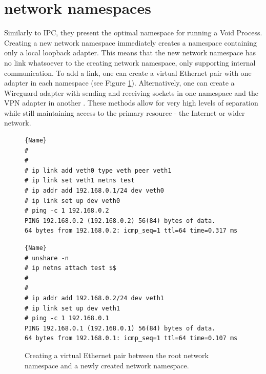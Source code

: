\documentclass[a4paper,12pt,twoside,openright]{report}
\begin{document}
\section{network namespaces}
\label{sec:voiding-net}

Similarly to IPC, they present the optimal namespace for running a Void Process. Creating a new network namespace immediately creates a namespace containing only a local loopback adapter. This means that the new network namespace has no link whatsoever to the creating network namespace, only supporting internal communication. To add a link, one can create a virtual Ethernet pair with one adapter in each namespace (see Figure \ref{fig:virtual-ethernet}). Alternatively, one can create a Wireguard adapter with sending and receiving sockets in one namespace and the VPN adapter in another \citep[§7.3]{donenfeld_wireguard_2017}. These methods allow for very high levels of separation while still maintaining access to the primary resource - the Internet or wider network.

\begin{figure}
\begin{minipage}{.45\textwidth}

\begin{lstlisting}[frame=tlrb,showlines=true]{Name}
#
#
# ip link add veth0 type veth peer veth1
# ip link set veth1 netns test
# ip addr add 192.168.0.1/24 dev veth0
# ip link set up dev veth0
# ping -c 1 192.168.0.2
PING 192.168.0.2 (192.168.0.2) 56(84) bytes of data.
64 bytes from 192.168.0.2: icmp_seq=1 ttl=64 time=0.317 ms
\end{lstlisting}

\end{minipage}\hfill
\begin{minipage}{.45\textwidth}

\begin{lstlisting}[frame=tlrb]{Name}
# unshare -n
# ip netns attach test $$
#
#
# ip addr add 192.168.0.2/24 dev veth1
# ip link set up dev veth1
# ping -c 1 192.168.0.1
PING 192.168.0.1 (192.168.0.1) 56(84) bytes of data.
64 bytes from 192.168.0.1: icmp_seq=1 ttl=64 time=0.107 ms
\end{lstlisting}

\end{minipage}

\caption{Creating a virtual Ethernet pair between the root network namespace and a newly created network namespace.}
\label{fig:virtual-ethernet}
\end{figure}
\end{document}
